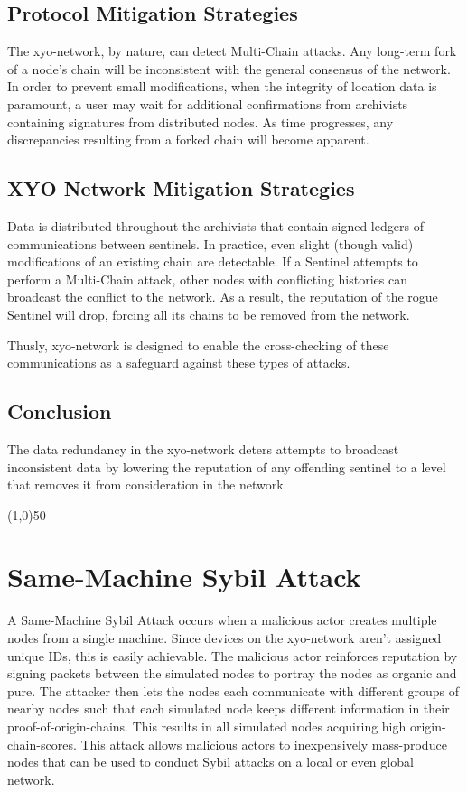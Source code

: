\documentclass{article}
\begin{document}
\subsection{Protocol Mitigation Strategies}

The \Gls{xyo-network}, by nature, can detect Multi-Chain attacks. Any long-term fork of a node's chain will be inconsistent with the general consensus of the network. In order to prevent small modifications, when the integrity of location data is paramount, a user may wait for additional confirmations from \Glspl{archivist} containing signatures from distributed nodes. As time progresses, any discrepancies resulting from a forked chain will become apparent.

\subsection{XYO Network Mitigation Strategies}

Data is distributed throughout the \Glspl{archivist} that contain signed ledgers of communications between \Glspl{sentinel}. In practice, even slight (though valid) modifications of an existing chain are detectable. If a Sentinel attempts to perform a Multi-Chain attack, other nodes with conflicting histories can broadcast the conflict to the network. As a result, the reputation of the rogue Sentinel will drop, forcing all its chains to be removed from the network.

Thusly, \Gls{xyo-network} is designed to enable the cross-checking of these communications as a safeguard against these types of attacks.

\subsection{Conclusion}

The data redundancy in the \Gls{xyo-network} deters attempts to broadcast inconsistent data by lowering the reputation of any offending \Gls{sentinel} to a level that removes it from consideration in the network.

\begin{center}
\line(1,0){50}
\end{center}

\section{Same-Machine Sybil Attack}
A Same-Machine Sybil Attack occurs when a malicious actor creates multiple nodes from a single machine. Since devices on the \Gls{xyo-network} aren't assigned unique IDs, this is easily achievable. The malicious actor reinforces reputation by signing packets between the simulated nodes to portray the nodes as organic and pure. The attacker then lets the nodes each communicate with different groups of nearby nodes such that each simulated node keeps different information in their \Glspl{proof-of-origin-chain}. This results in all simulated nodes acquiring high \Glspl{origin-chain-score}. This attack allows malicious actors to inexpensively mass-produce nodes that can be used to conduct Sybil attacks on a local or even global network. 
\end{document}
